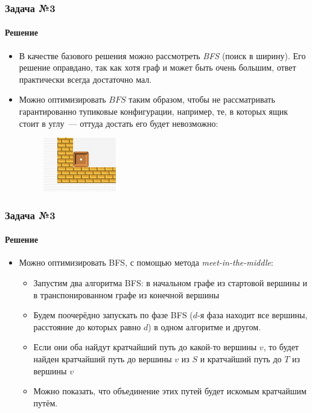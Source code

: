 \documentclass{beamer}
\begin{document}
\begin{frame}
\frametitle{Задача №3}
\framesubtitle{Решение}
\begin{itemize}
\item В качестве базового решения можно рассмотреть \emph{BFS} (поиск в ширину). Его решение оправдано, так как хотя граф и может быть очень большим, ответ практически всегда достаточно мал.
\item Можно оптимизировать $BFS$ таким образом, чтобы не рассматривать гарантированно тупиковые конфигурации, например, те, в которых ящик стоит в углу~--- оттуда достать его будет невозможно:
    \begin{figure}
    \centering
    \includegraphics[width=0.3\textwidth]{photo_2020-06-29_01-28-58.jpg}
    \end{figure}
\end{itemize}
\end{frame}








\begin{frame}
\frametitle{Задача №3}
\framesubtitle{Решение}
\begin{itemize}
\item Можно оптимизировать BFS, с помощью метода \emph{meet-in-the-middle}:
\begin{itemize}
\item Запустим два алгоритма BFS: в начальном графе из стартовой вершины и в транспонированном графе из конечной вершины
\item Будем поочерёдно запускать по фазе BFS ($d$-я фаза находит все вершины, расстояние до которых равно $d$) в одном алгоритме и другом.
\item Если они оба найдут кратчайший путь до какой-то вершины $v$, то будет найден кратчайший путь до вершины $v$ из $S$ и кратчайший путь до $T$ из вершины $v$
\item Можно показать, что объединение этих путей будет искомым кратчайшим путём.
\end{itemize}
\end{itemize}
\end{frame}
\end{document}
